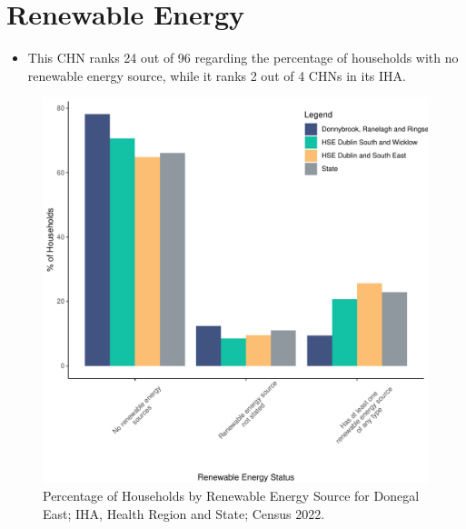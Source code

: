 \documentclass{article}
\begin{document}
\section{Renewable Energy}\label{sect:RE}
\begin{itemize}
\item This CHN ranks  24 out of 96 regarding the percentage of households with no renewable energy source, while it ranks   2 out of 4 CHNs in its IHA.
\end{itemize}
\begin{figure}[H]
	\centering
	\includegraphics[width = 140mm]{../figures/RenewableEnergyED.pdf}
	\caption{Percentage of Households by Renewable Energy Source for Donegal East; IHA, Health Region and State; Census 2022.}
	\label{fig:vbnv}
	\end{figure}
\end{document}
